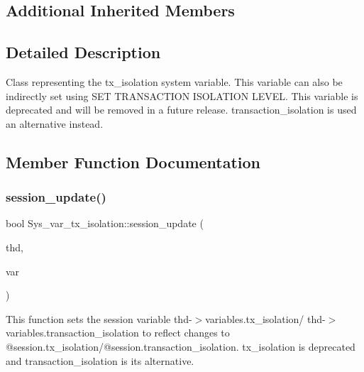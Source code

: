 \subsection*{Additional Inherited Members}


\subsection{Detailed Description}
Class representing the \textquotesingle{}tx\+\_\+isolation\textquotesingle{} system variable. This variable can also be indirectly set using \textquotesingle{}S\+ET T\+R\+A\+N\+S\+A\+C\+T\+I\+ON I\+S\+O\+L\+A\+T\+I\+ON L\+E\+V\+EL\textquotesingle{}. This variable is deprecated and will be removed in a future release. \textquotesingle{}transaction\+\_\+isolation\textquotesingle{} is used an alternative instead. 

\subsection{Member Function Documentation}
\mbox{\label{classSys__var__tx__isolation_a7c95e5b9a2dd36a02a9ff05d6ada8d42}} 
\subsubsection{\texorpdfstring{session\+\_\+update()}{session\_update()}}
{\footnotesize\ttfamily bool Sys\+\_\+var\+\_\+tx\+\_\+isolation\+::session\+\_\+update (\begin{DoxyParamCaption}\item[{T\+HD $\ast$}]{thd,  }\item[{\mbox{\hyperlink{classset__var}{set\+\_\+var}} $\ast$}]{var }\end{DoxyParamCaption})\hspace{0.3cm}{\ttfamily [virtual]}}

This function sets the session variable thd-\/$>$variables.\+tx\+\_\+isolation/ thd-\/$>$variables.\+transaction\+\_\+isolation to reflect changes to @session.\+tx\+\_\+isolation/@session.\+transaction\+\_\+isolation. \textquotesingle{}tx\+\_\+isolation\textquotesingle{} is deprecated and \textquotesingle{}transaction\+\_\+isolation\textquotesingle{} is its alternative.


